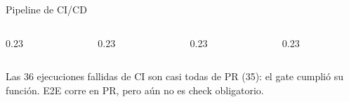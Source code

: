 \begin{frame}{Pipeline de CI/CD}
\begin{columns}[T,onlytextwidth]
\begin{column}{0.23\textwidth}\centering{}\end{column}
\begin{column}{0.23\textwidth}\centering{}\end{column}
\begin{column}{0.23\textwidth}\centering{}\end{column}
\begin{column}{0.23\textwidth}\centering{}\end{column}
\end{columns}
\vspace{0.1cm}
\centering\scriptsize Las 36 ejecuciones fallidas de CI son casi todas de PR (35): el gate cumplió su función. E2E corre en PR, pero aún no es check obligatorio.
\end{frame}

